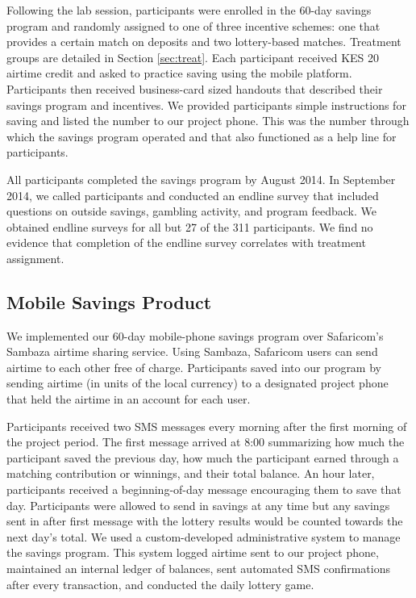 \documentclass[12pt]{article}
\begin{document}
		Following the lab session, participants were enrolled in the 60-day savings program and randomly assigned to one of three incentive schemes: one that provides a certain match on deposits and two lottery-based matches. Treatment groups are detailed in Section \ref{sec:treat}. Each participant received KES 20 airtime credit and asked to practice saving using the mobile platform. Participants then received business-card sized handouts that described their savings program and incentives. We provided participants simple instructions for saving and listed the number to our project phone. This was the number through which the savings program operated and that also functioned as a help line for participants.

		All participants completed the savings program by August 2014. In September 2014, we called participants and conducted an endline survey that included questions on outside savings, gambling activity, and program feedback. We obtained endline surveys for all but 27 of the 311 participants. We find no evidence that completion of the endline survey correlates with treatment assignment.

		\clearpage

	\subsection{Mobile Savings Product}

		We implemented our 60-day mobile-phone savings program over Safaricom's Sambaza airtime sharing service. Using Sambaza, Safaricom users can send airtime to each other free of charge. Participants saved into our program by sending airtime (in units of the local currency) to a designated project phone that held the airtime in an account for each user.

		Participants received two SMS messages every morning after the first morning of the project period. The first message arrived at 8:00 summarizing how much the participant saved the previous day, how much the participant earned through a matching contribution or winnings, and their total balance. An hour later, participants received a beginning-of-day message encouraging them to save that day. Participants were allowed to send in savings at any time but any savings sent in after first message with the lottery results would be counted towards the next day's total. We used a custom-developed administrative system to manage the savings program. This system logged airtime sent to our project phone, maintained an internal ledger of balances, sent automated SMS confirmations after every transaction, and conducted the daily lottery game.
\end{document}
